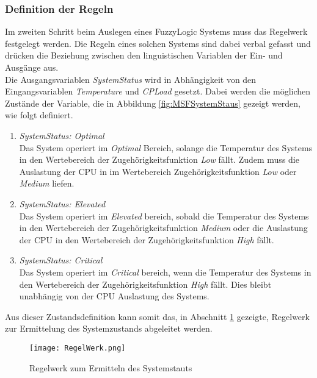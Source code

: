 \subsubsection*{Definition der Regeln}\label{sec:FLRuleBase}
Im zweiten Schritt beim Auslegen eines FuzzyLogic Systems muss das Regelwerk festgelegt werden. Die Regeln eines solchen Systems sind dabei verbal gefasst und drücken die Beziehung zwischen den linguistischen Variablen der Ein- und Ausgänge aus.\cite{FLRegelwerk} \\
Die Ausgangsvariablen \textit{SystemStatus} wird in Abhängigkeit von den Eingangsvariablen \textit{Temperature} und \textit{CPLoad} gesetzt. Dabei werden die möglichen Zustände der Variable, die in Abbildung \ref{fig:MSFSystemStaus} gezeigt werden, wie folgt definiert. 
\begin{enumerate}
    \item \textit{SystemStatus: Optimal}\\
    Das System operiert im \textit{Optimal} Bereich, solange die Temperatur des Systems in den Wertebereich der Zugehörigkeitsfunktion \textit{Low} fällt. Zudem muss die Auslastung der CPU in im Wertebereich Zugehörigkeitsfunktion \textit{Low} oder \textit{Medium} liefen.  
    \item \textit{SystemStatus: Elevated}\\
    Das System operiert im \textit{Elevated} bereich, sobald die Temperatur des Systems in den Wertebereich der Zugehörigkeitsfunktion \textit{Medium} oder die Auslastung der CPU in den Wertebereich der Zugehörigkeitsfunktion \textit{High} fällt.
    \item \textit{SystemStatus: Critical}\\
    Das System operiert im \textit{Critical} bereich, wenn die Temperatur des Systems in den Wertebereich der Zugehörigkeitsfunktion \textit{High} fällt. Dies bleibt unabhängig von der CPU Auslastung des Systems. 
\end{enumerate}
Aus dieser Zustandsdefinition kann somit das, in Abschnitt \ref{fig:FuzzyLogicRuleBase} gezeigte, Regelwerk zur Ermittelung des Systemzustands abgeleitet werden.  
\begin{center}
    \begin{figure}[h!]
        \centering
        \texttt{[image: RegelWerk.png]}
        \caption{Regelwerk zum Ermitteln des Systemstauts}
        \label{fig:FuzzyLogicRuleBase}
    \end{figure}
\end{center}
\vspace{-0.5cm}  

